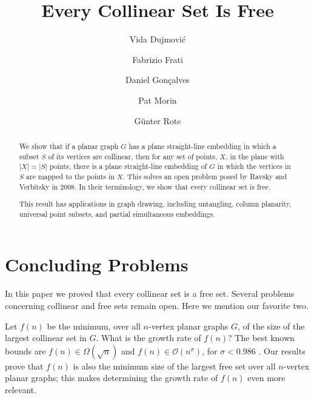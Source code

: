 \documentclass[a4paper, 11pt]{llncs}
\begin{document}
\title{Every Collinear Set Is Free}
\author{Vida Dujmovi\'c\and Fabrizio Frati  \and Daniel Gon\c{c}alves  \and Pat Morin  \and G\"unter Rote}
\maketitle

\linenumbers

\begin{abstract}
  We show that if a planar graph $G$ has a plane straight-line embedding
  in which a subset $S$ of its vertices are collinear, then for any
  set of points, $X$, in the plane with $|X|=|S|$ points, there is a plane straight-line
  embedding of $G$ in which the vertices in $S$ are mapped to the points
  in $X$.  This solves an open problem posed by Ravsky and Verbitsky in
  2008.  In their terminology, we show that every collinear set is free.
  
  This result has applications in graph drawing, including untangling,
  column planarity, universal point subsets, and partial simultaneous
  embeddings.
\end{abstract}

\newpage
{}
\pagestyle{plain}






\section{Concluding Problems}

In this paper we proved that every collinear set is a free set. Several problems concerning collinear and free sets remain open. Here we mention our favorite two.

Let $f(n)$ be the minimum, over all $n$-vertex planar graphs $G$, of the size of the largest collinear set in $G$. What is the growth rate of $f(n)$? The best known bounds are $f(n)\in\Omega(\sqrt{n})$ and $f(n)\in \mathcal{O}(n^\sigma)$, for $\sigma < 0.986$ \cite{bose.dujmovic.ea:polynomial,ravsky.verbitsky:on}. Our results prove that $f(n)$ is also the minimum size of the largest free set over all $n$-vertex planar graphs; this makes determining the growth rate of $f(n)$ even more relevant.
%
\end{document}
